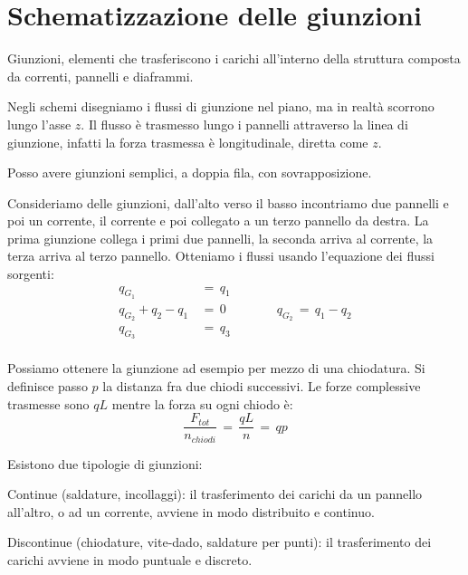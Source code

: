 \section{Schematizzazione delle giunzioni}

\begin{definizioneBox}
    Giunzioni, elementi che trasferiscono i carichi all'interno della struttura composta da correnti, pannelli e diaframmi.
\end{definizioneBox}

Negli schemi disegniamo i flussi di giunzione nel piano, ma in realtà scorrono lungo l'asse $z$. Il flusso è trasmesso lungo i pannelli attraverso la linea di giunzione, infatti la forza trasmessa è longitudinale, diretta come $z$.

Posso avere giunzioni semplici, a doppia fila, con sovrapposizione.

\begin{esempioBox}
    Consideriamo delle giunzioni, dall'alto verso il basso incontriamo due pannelli e poi un corrente, il corrente e poi collegato a un terzo pannello da destra. La prima giunzione collega i primi due pannelli, la seconda arriva al corrente, la terza arriva al terzo pannello.
    Otteniamo i flussi usando l'equazione dei flussi sorgenti:
    \begin{align*}
        q_{G_1} \,&=\,q_1\\
        q_{G_2} +q_2-q_1\,&=\,0   \qquad \qquad     q_{G_2} \,=\,q_1-q_2\\
        q_{G_3} \,&=\,q_3\\
    \end{align*}
\end{esempioBox}

Possiamo ottenere la giunzione ad esempio per mezzo di una chiodatura. Si definisce passo $p$ la distanza fra due chiodi successivi.
Le forze complessive trasmesse sono $qL$ mentre la forza su ogni chiodo è:
\begin{equation*}
    \frac{F_{tot}}{n_{chiodi}} \,=\, \frac{qL}{n} \,=\,qp
\end{equation*}

Esistono due tipologie di giunzioni:
\begin{compactitem}
    \item Continue (saldature, incollaggi): il trasferimento dei carichi da un pannello all'altro, o ad un corrente, avviene in modo distribuito e continuo.\\
    \item Discontinue (chiodature, vite-dado, saldature per punti): il trasferimento dei carichi avviene in modo puntuale e discreto.
\end{compactitem}
